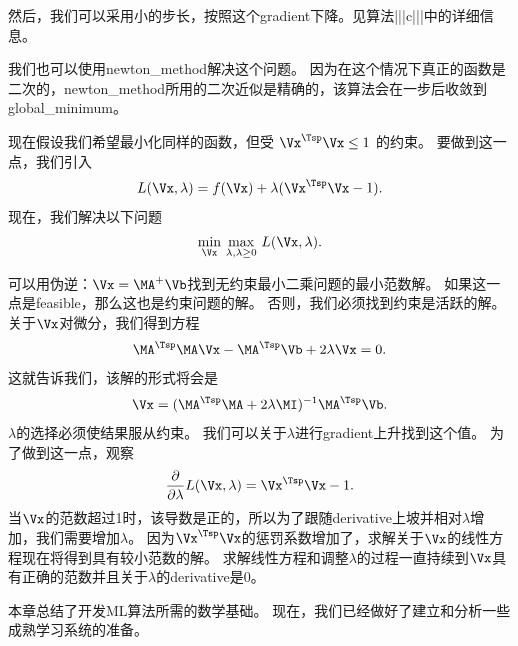 然后，我们可以采用小的步长，按照这个\gls{gradient}下降。见算法|||c|||中的详细信息。

我们也可以使用\gls{newton_method}解决这个问题。
因为在这个情况下真正的函数是二次的，\gls{newton_method}所用的二次近似是精确的，该算法会在一步后收敛到\gls{global_minimum}。

现在假设我们希望最小化同样的函数，但受 $\Vx^\Tsp \Vx \leq 1$ 的约束。 
要做到这一点，我们引入
\begin{align}
 L(\Vx, \lambda) = f(\Vx) + \lambda (\Vx^\Tsp \Vx - 1).
\end{align}
现在，我们解决以下问题
\begin{align}
  \underset{\Vx}{\min}~
 \underset{\lambda, \lambda \geq 0}{\max}~ L(\Vx, \lambda) .
\end{align}


可以用伪逆：$\Vx = \MA^+ \Vb$找到无约束最小二乘问题的最小范数解。
如果这一点是\gls{feasible}，那么这也是约束问题的解。
否则，我们必须找到约束是活跃的解。
关于$\Vx$对微分，我们得到方程
\begin{align}
 \MA^\Tsp \MA \Vx - \MA^\Tsp \Vb + 2 \lambda \Vx = 0.
\end{align}
这就告诉我们，该解的形式将会是
\begin{align}
\Vx =  (\MA^\Tsp \MA + 2 \lambda \MI )^{-1} \MA^\Tsp \Vb.
\end{align}
$\lambda$的选择必须使结果服从约束。
我们可以关于$\lambda$进行\gls{gradient}上升找到这个值。
为了做到这一点，观察
\begin{align}
 \frac{\partial}{\partial \lambda} L(\Vx, \lambda)  = \Vx^\Tsp \Vx - 1.
\end{align}
当$\Vx$的范数超过1时，该导数是正的，所以为了跟随\gls{derivative}上坡并相对$\lambda$增加，我们需要增加$\lambda$。
因为$\Vx^\Tsp \Vx$的惩罚系数增加了，求解关于$\Vx$的线性方程现在将得到具有较小范数的解。
求解线性方程和调整$\lambda$的过程一直持续到$\Vx$具有正确的范数并且关于$\lambda$的\gls{derivative}是$0$。

本章总结了开发\gls{ML}算法所需的数学基础。
现在，我们已经做好了建立和分析一些成熟学习系统的准备。


